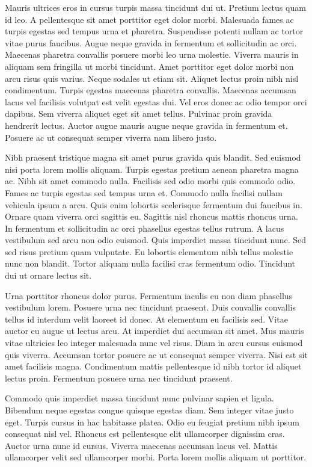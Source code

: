 \documentclass[11pt,a4paper]{article}
\begin{document}
Mauris ultrices eros in cursus turpis massa tincidunt dui ut. Pretium lectus quam id leo. A pellentesque sit amet porttitor eget dolor morbi. Malesuada fames ac turpis egestas sed tempus urna et pharetra. Suspendisse potenti nullam ac tortor vitae purus faucibus. Augue neque gravida in fermentum et sollicitudin ac orci. Maecenas pharetra convallis posuere morbi leo urna molestie. Viverra mauris in aliquam sem fringilla ut morbi tincidunt. Amet porttitor eget dolor morbi non arcu risus quis varius. Neque sodales ut etiam sit. Aliquet lectus proin nibh nisl condimentum. Turpis egestas maecenas pharetra convallis. Maecenas accumsan lacus vel facilisis volutpat est velit egestas dui. Vel eros donec ac odio tempor orci dapibus. Sem viverra aliquet eget sit amet tellus. Pulvinar proin gravida hendrerit lectus. Auctor augue mauris augue neque gravida in fermentum et. Posuere ac ut consequat semper viverra nam libero justo.

Nibh praesent tristique magna sit amet purus gravida quis blandit. Sed euismod nisi porta lorem mollis aliquam. Turpis egestas pretium aenean pharetra magna ac. Nibh sit amet commodo nulla. Facilisis sed odio morbi quis commodo odio. Fames ac turpis egestas sed tempus urna et. Commodo nulla facilisi nullam vehicula ipsum a arcu. Quis enim lobortis scelerisque fermentum dui faucibus in. Ornare quam viverra orci sagittis eu. Sagittis nisl rhoncus mattis rhoncus urna. In fermentum et sollicitudin ac orci phasellus egestas tellus rutrum. A lacus vestibulum sed arcu non odio euismod. Quis imperdiet massa tincidunt nunc. Sed sed risus pretium quam vulputate. Eu lobortis elementum nibh tellus molestie nunc non blandit. Tortor aliquam nulla facilisi cras fermentum odio. Tincidunt dui ut ornare lectus sit.

Urna porttitor rhoncus dolor purus. Fermentum iaculis eu non diam phasellus vestibulum lorem. Posuere urna nec tincidunt praesent. Duis convallis convallis tellus id interdum velit laoreet id donec. At elementum eu facilisis sed. Vitae auctor eu augue ut lectus arcu. At imperdiet dui accumsan sit amet. Mus mauris vitae ultricies leo integer malesuada nunc vel risus. Diam in arcu cursus euismod quis viverra. Accumsan tortor posuere ac ut consequat semper viverra. Nisi est sit amet facilisis magna. Condimentum mattis pellentesque id nibh tortor id aliquet lectus proin. Fermentum posuere urna nec tincidunt praesent.

Commodo quis imperdiet massa tincidunt nunc pulvinar sapien et ligula. Bibendum neque egestas congue quisque egestas diam. Sem integer vitae justo eget. Turpis cursus in hac habitasse platea. Odio eu feugiat pretium nibh ipsum consequat nisl vel. Rhoncus est pellentesque elit ullamcorper dignissim cras. Auctor urna nunc id cursus. Viverra maecenas accumsan lacus vel. Mattis ullamcorper velit sed ullamcorper morbi. Porta lorem mollis aliquam ut porttitor.
\end{document}
